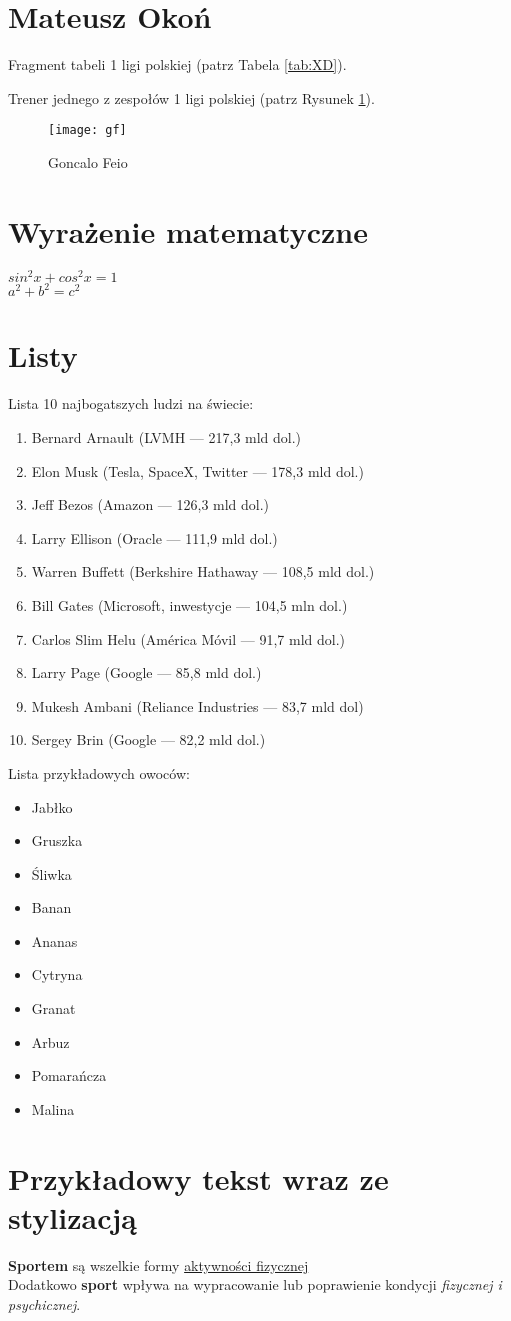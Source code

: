 \section*{Mateusz Okoń}

Fragment tabeli 1 ligi polskiej (patrz Tabela \ref{tab:XD}).



Trener jednego z zespołów 1 ligi polskiej (patrz Rysunek \ref{fig:gf}).
\begin{figure}[htbp]
    \centering
    \texttt{[image: gf]}
    \caption{Goncalo Feio}
    \label{fig:gf}    
\end{figure}

\section*{Wyrażenie matematyczne}
$sin^2x+cos^2x =1$ \\
$a^2+b^2= c^2$

\section*{Listy}
Lista 10 najbogatszych ludzi na świecie:
\begin{enumerate}
    \item Bernard Arnault (LVMH — 217,3 mld dol.)
    \item Elon Musk (Tesla, SpaceX, Twitter — 178,3 mld dol.)
    \item Jeff Bezos (Amazon — 126,3 mld dol.)
    \item Larry Ellison (Oracle — 111,9 mld dol.)
    \item Warren Buffett (Berkshire Hathaway — 108,5 mld dol.)
    \item Bill Gates (Microsoft, inwestycje — 104,5 mln dol.)
    \item Carlos Slim Helu (América Móvil — 91,7 mld dol.)
    \item Larry Page (Google — 85,8 mld dol.)
    \item Mukesh Ambani (Reliance Industries — 83,7 mld dol)
    \item Sergey Brin (Google — 82,2 mld dol.)
\end{enumerate}

Lista przykładowych owoców:
\begin{itemize}
    \item Jabłko
    \item Gruszka
    \item Śliwka
    \item Banan
    \item Ananas
    \item Cytryna
    \item Granat
    \item Arbuz
    \item Pomarańcza
    \item Malina
\end{itemize}

\section*{Przykładowy tekst wraz ze stylizacją}
\textbf{Sportem} są wszelkie formy \underline{aktywności fizycznej}\\
Dodatkowo \textbf{sport} wpływa na wypracowanie lub poprawienie kondycji \textit{fizycznej i psychicznej}.


